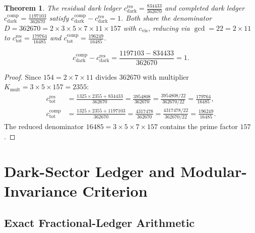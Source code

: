 \documentclass[11pt,letterpaper]{article}
\theoremstyle{plain}
\newtheorem{theorem}{Theorem}
\begin{document}
\begin{theorem}
The residual dark ledger $c_{\text{dark}}^{\text{res}} = \frac{834433}{362670}$ and completed dark ledger $c_{\text{dark}}^{\text{comp}} = \frac{1197103}{362670}$ satisfy $c_{\text{dark}}^{\text{comp}} - c_{\text{dark}}^{\text{res}} = 1$. Both share the denominator $D = 362670 = 2 \times 3 \times 5 \times 7 \times 11 \times 157$ with $c_{\text{vis}}$, reducing via $\gcd = 22 = 2 \times 11$ to $c_{\text{tot}}^{\text{res}} = \frac{179764}{16485}$ and $c_{\text{tot}}^{\text{comp}} = \frac{196249}{16485}$.
\end{theorem}

\begin{equation}
\label{eq:dark-completion-fraction}
 c_{\text{dark}}^{\text{comp}}-c_{\text{dark}}^{\text{res}}
 =
 \frac{1197103-834433}{362670}
 =1.
\end{equation}

\begin{proof}
Since $154 = 2 \times 7 \times 11$ divides $362670$ with multiplier $K_{\text{mult}} = 3 \times 5 \times 157 = 2355$:
\begin{align}
c_{\text{tot}}^{\text{res}} &= \frac{1325 \times 2355 + 834433}{362670} = \frac{3954808}{362670} = \frac{3954808 / 22}{362670 / 22} = \frac{179764}{16485}, \\
c_{\text{tot}}^{\text{comp}} &= \frac{1325 \times 2355 + 1197103}{362670} = \frac{4317478}{362670} = \frac{4317478 / 22}{362670 / 22} = \frac{196249}{16485}.
\end{align}
The reduced denominator $16485 = 3 \times 5 \times 7 \times 157$ contains the prime factor $157$.
\end{proof}

\section{Dark-Sector Ledger and Modular-Invariance Criterion}
\label{app:dark-cft-criterion}

\subsection{Exact Fractional-Ledger Arithmetic}
\end{document}
